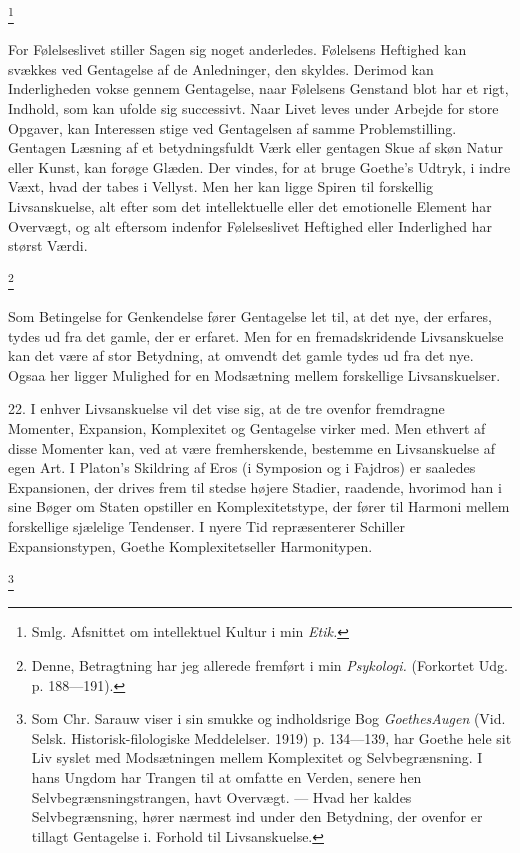 \documentclass[12pt]{article}
\newcommand{\apage}[1]{\marginnote{\footnotesize\textit{[#1]}}}
\begin{document}
         \footnote{Smlg. Afsnittet om intellektuel Kultur i min \textit{Etik.}}

\setcounter{footnote}{0}%
\apage{67}For Følelseslivet stiller Sagen sig noget anderledes. Følelsens
Heftighed kan svækkes ved Gentagelse af de Anledninger, den skyldes. Derimod
kan Inderligheden vokse gennem Gentagelse, naar Følelsens Genstand blot har et
rigt, Indhold, som kan ufolde sig successivt. Naar Livet leves under Arbejde
for store Opgaver, kan Interessen stige ved Gentagelsen af samme
Problemstilling. Gentagen Læsning af et betydningsfuldt Værk eller gentagen
Skue af skøn Natur eller Kunst, kan forøge Glæden. Der vindes, for at bruge
Goethe's Udtryk, i indre Væxt, hvad der tabes i Vellyst. Men her kan ligge
Spiren til forskellig Livsanskuelse, alt efter som det intellektuelle eller det
emotionelle Element har Overvægt, og alt eftersom indenfor Følelseslivet
Heftighed eller Inderlighed har størst Værdi.

         \footnote{Denne, Betragtning har jeg allerede fremført i min
\textit{Psykologi. }(Forkortet Udg. p. 188---191).}

Som Betingelse for Genkendelse fører Gentagelse let til, at det nye, der
erfares, tydes ud fra det gamle, der er erfaret. Men for en fremadskridende
Livsanskuelse kan det være af stor Betydning, at omvendt det gamle tydes ud fra
det nye. Ogsaa her ligger Mulighed for en Modsætning mellem forskellige
Livsanskuelser.

22. I enhver Livsanskuelse vil det vise sig, at de tre ovenfor fremdragne
Momenter, Expansion, Komplexitet og Gentagelse virker med. Men ethvert af disse
Momenter kan, ved at være fremherskende, bestemme en Livsanskuelse af egen Art.
I Platon's Skildring af Eros (i Symposion og i Fajdros) er saaledes
Expansionen, der drives frem til stedse højere Stadier, raadende, hvorimod han
i sine Bøger om \guillemotright{}Staten\guillemotleft{} opstiller en
Komplexitetstype, der fører til Harmoni mellem forskellige sjælelige Tendenser.
I nyere Tid
\setcounter{footnote}{0}%
\apage{68}repræsenterer Schiller Expansionstypen, Goethe Komplexitetseller
Harmonitypen.

         \footnote{Som Chr. Sarauw viser i sin smukke og indholdsrige Bog
\textit{Goethes}\textit{Augen} (Vid. Selsk. Historisk-filologiske Meddelelser.
1919) p. 134---139, har Goethe hele sit Liv syslet med Modsætningen mellem
Komplexitet og Selvbegrænsning. I hans Ungdom har Trangen til at omfatte en
Verden, senere hen Selvbegrænsningstrangen, havt Overvægt. --- Hvad her kaldes
Selvbegrænsning, hører nærmest ind under den Betydning, der ovenfor er tillagt
Gentagelse i. Forhold til Livsanskuelse.}
\end{document}
